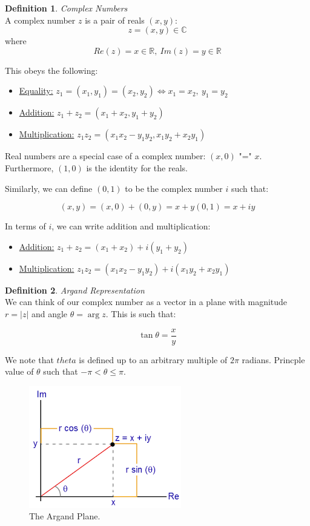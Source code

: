 \documentclass{article}
\theoremstyle{definition}
\newtheorem{definition}{Definition}[section]
\newcommand{\Def}[2]{
\begin{shaded*}
\begin{definition}{\textit{#1}}\\#2\end{definition}
\end{shaded*}
}
\def\R{\mathbb{R}}
\def\C{\mathbb{C}}
\begin{document}
\Def{Complex Numbers}{A complex number $z$ is a pair of reals $(x,y):$
$$z = (x,y) \in \C$$
where
$$Re(z) = x \in \R,\ Im(z) = y \in \R$$

This obeys the following:
\begin{itemize}
	\item \underline{Equality:} $z_1 = (x_1, y_1) = (x_2, y_2) \iff x_1 = x_2,\ y_1 = y_2$
	\item \underline{Addition:} $z_1 + z_2 = (x_1 + x_2, y_1+y_2)$
	\item \underline{Multiplication:} $z_1 z_2 = (x_1 x_2 - y_1 y_2, x_1 y_2 + x_2 y_1)$
\end{itemize}
}

Real numbers are a special case of a complex number: $(x, 0) $ "=" $x$. Furthermore, $(1,0)$ is the identity for the reals. 

Similarly, we can define $(0,1)$ to be the complex number $i$ such that:

$$(x,y) = (x, 0) + (0,y) = x + y(0,1) = x + iy$$

In terms of $i$, we can write addition and multiplication:

\begin{itemize}
	\item \underline{Addition:} $z_1 + z_2 = (x_1 + x_2) + i (y_1+y_2)$
	\item \underline{Multiplication:} $z_1 z_2 = (x_1 x_2 - y_1 y_2) + i (x_1 y_2 + x_2 y_1)$
\end{itemize}


\Def{Argand Representation}{We can think of our complex number as a vector in a plane with magnitude $r = |z|$ and angle $\theta = \arg z$. This is such that:

$$\tan \theta = \frac{x}{y}$$

We note that $theta$ is defined up to an arbitrary multiple of $2\pi$ radians. Princple value of $\theta$ such that $-\pi < \theta \leq \pi.$

\begin{figure}[H]
	\centering
	\includegraphics[width=0.5\linewidth]{Argand_plane}
	\caption{The Argand Plane.}
	\label{fig:argand}
\end{figure}
}
\end{document}
